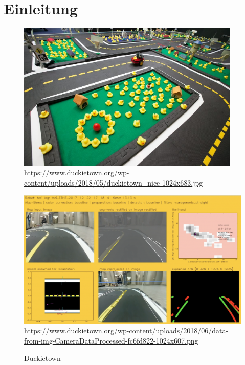 \chapter{Einleitung}

\begin{figure}[H]
	\centering
	\begin{minipage}{.5\textwidth}
		\centering
		\includegraphics[width=0.95\textwidth]{kapitel1/images/duckietown.png}
		\quelle\url{https://www.duckietown.org/wp-content/uploads/2018/05/duckietown_nice-1024x683.jpg}
		\label{fig:duckietown}
	\end{minipage}%
	\begin{minipage}{.5\textwidth}
		\centering
		\includegraphics[width=1.072\textwidth]{kapitel1/images/duckietown2.png}
		\quelle\url{https://www.duckietown.org/wp-content/uploads/2018/06/data-from-img-CameraDataProcessed-fc6fd822-1024x607.png}
		\label{fig:duckietown2}
	\end{minipage}
	\caption{Duckietown}
\end{figure}

